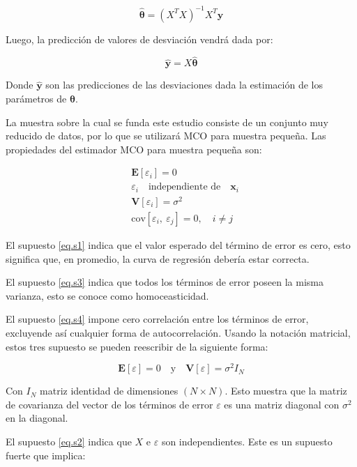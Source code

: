 \begin{equation}
    \label{eq.mco}
    \bm{\hat\theta} = \left( X^TX\right)^{-1}X^T\bm{y}
\end{equation}

Luego, la predicción de valores de desviación vendrá dada por:

\begin{equation}
    \label{eq.predicc}
    \hat{\bm{y}} = X\hat{\bm{\theta}}
\end{equation}

Donde $\hat{\bm{y}}$ son las predicciones de las desviaciones dada la estimación de los parámetros de $\bm{\theta}$.  

La muestra sobre la cual se funda este estudio consiste de un conjunto muy reducido de datos, por lo que se utilizará MCO para muestra pequeña. Las propiedades del estimador MCO para muestra pequeña son:

\begin{align}
    & \label{eq.s1} \bm{E}[\varepsilon_i] = 0\\
    & \label{eq.s2} \varepsilon_i\quad\text{independiente de}\quad \bm{x}_i\\
    & \label{eq.s3} \bm{V}[\varepsilon_i]=\sigma^2 \\
    & \label{eq.s4} \text{cov}[\varepsilon_i,~\varepsilon_j] = 0,\quad i\neq j
\end{align}

El supuesto \eqref{eq.s1} indica que el valor esperado del término de error es cero, esto significa que, en promedio, la curva de regresión debería estar correcta. 

El supuesto \eqref{eq.s3} indica que todos los términos de error poseen la misma varianza, esto se conoce como homoceasticidad.

El supuesto \eqref{eq.s4} impone cero correlación entre los términos de error, excluyende así cualquier forma de autocorrelación. Usando la notación matricial, estos tres supuesto se pueden reescribir de la siguiente forma:

\begin{equation}
    \bm{E}[\varepsilon]=0\quad\text{y}\quad\bm{V}[\varepsilon]=\sigma^2I_N
\end{equation}

Con $I_N$ matriz identidad de dimensiones $(N\times N)$. Esto muestra que la matriz de covarianza del vector de los términos de error $\varepsilon$ es una matriz diagonal con $\sigma^2$ en la diagonal.

El supuesto \eqref{eq.s2} indica que $X$ e $\varepsilon$ son independientes. Este es un supuesto fuerte que implica:

